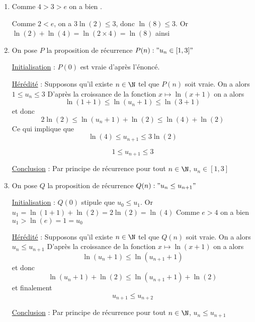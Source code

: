\documentclass[a4paper, 11pt,reqno]{article}
\begin{document}
\begin{correction}
\begin{enumerate}
\item Comme $4>3>e$ on a bien 
.

Comme  $2<e$, on a $3\ln(2) \leq 3$, donc $\ln(8)\leq 3$. Or $\ln(2)+\ln(4)=\ln(2\times 4)=\ln(8)$ ainsi

\item On pose $P$ la proposition de récurrence  $P(n) : " u_n \in [1,3]"$

\underline{Initialisation} : 
$P(0)$ est vraie d'après l'énoncé. 

\underline{Hérédité} : 
Supposons qu'il existe $n\in \N$ tel que $P(n)$ soit vraie. On a alors $1\leq u_n\leq 3$
D'après la croissance de la fonction $x\mapsto \ln(x+1)$ on a alors 
$$\ln(1+1 )\leq \ln(u_n+1) \leq \ln( 3+1)$$
et donc 
$$2\ln(2)\leq \ln(u_n+1) +\ln(2) \leq \ln( 4)+\ln(2) $$
Ce qui implique que 
$$\ln(4)\leq u_{n+1}\leq3\ln( 2)$$

$$1\leq u_{n+1} \leq 3$$

\underline{Conclusion} : 
Par principe de récurrence pour tout $n\in \N$, $u_n\in [1,3]$

\item 
On pose $Q$ la proposition de récurrence  $Q(n) : " u_n\leq u_{n+1}"$

\underline{Initialisation} : 
$Q(0)$ stipule que  $u_0\leq u_1$. Or $u_1= \ln(1+1)+\ln(2)= 2\ln(2)=\ln(4)$
Comme $e>4$ on a bien $u_1 > \ln(e) =1=u_0$

\underline{Hérédité} : 
Supposons qu'il existe $n\in \N$ tel que $Q(n)$ soit vraie. On a alors $u_n\leq u_{n+1}$
D'après la croissance de la fonction $x\mapsto \ln(x+1)$ on a alors 
$$\ln(u_n+1 )\leq \ln(u_{n+1}+1) $$
et donc 
$$\ln(u_n+1 )+\ln(2)\leq \ln(u_{n+1}+1) +\ln(2)$$
et finalement 
$$u_{n+1} \leq u_{n+2}$$


\underline{Conclusion} : 
Par principe de récurrence pour tout $n\in \N$, $u_{n} \leq u_{n+1}$

\end{enumerate}
\end{correction}


\vspace{0.5cm}
\end{document}
